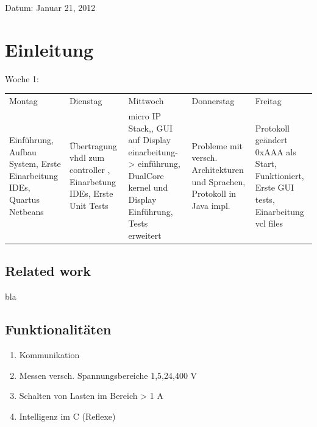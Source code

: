 \documentclass[
	11pt,								%
	a4paper,						%
	oneside,						%
	titlepage,					%
	headsepline,				%
	DIV13,							%
	abstracton,	 				%
	BCOR0cm,						%
	bibliography=totoc, %
]{scrreprt}							%
\begin{document}
	\begin{center}Datum: Januar 21, 2012\end{center}

	

	\tableofcontents

	
\chapter{Einleitung}
\label{cha:Einleitung}
Woche 1: 
\begin{center}
\begin{tabular}{lllll}
Montag & Dienstag & Mittwoch & Donnerstag & Freitag\\
Einführung, 
Aufbau System, 
Erste Einarbeitung IDEs, 
Quartus Netbeans 
& 
Übertragung vhdl zum controller \newline, Einarbetung IDEs, Erste Unit Tests & micro IP Stack,, GUI auf Display einarbeitung- > einführung, DualCore kernel und Display Einführung, Tests erweitert & Probleme mit versch. Architekturen und Sprachen, Protokoll in Java impl. & Protokoll geändert 0xAAA als Start, Funktioniert, Erste GUI tests, Einarbeitung vcl files
\end{tabular}
\end{center}


\section{Related work}
\label{sec:1Related work}
bla



\section{Funktionalitäten}
\label{sec:2Requirements}
\begin{enumerate}
 \item Kommunikation
 \item Messen versch. Spannungsbereiche 1,5,24,400 V
 \item Schalten von Lasten im Bereich > 1 A
 \item Intelligenz im C (Reflexe)
\end{enumerate}





\end{document}
